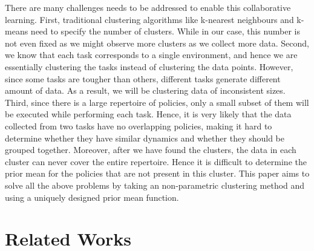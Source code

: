 \documentclass[journal]{IEEEtran}
\begin{document}
There are many challenges needs to be addressed to enable this collaborative learning. First, traditional clustering algorithms like k-nearest neighbours \cite{knn} and k-means \cite{k-means} need to specify the number of clusters. While in our case, this number is not even fixed as we might observe more clusters as we collect more data.
Second, we know that each task corresponds to a single environment, and hence we are essentially clustering the tasks instead of clustering the data points.
However, since some tasks are tougher than others, different tasks generate different amount of data. 
As a result, we will be clustering data of inconsistent sizes.
Third, since there is a large repertoire of policies, only a small subset of them will be executed while performing each task. Hence, it is very likely that the data collected from two tasks have no overlapping policies, making it hard to determine whether they have similar dynamics and whether they should be grouped together.
Moreover, after we have found the clusters, the data in each cluster can never cover the entire repertoire. Hence it is difficult to determine the prior mean for the policies that are not present in this cluster.
This paper aims to solve all the above problems by taking an non-parametric clustering method and using a uniquely designed prior mean function.

\section{Related Works}
\end{document}
